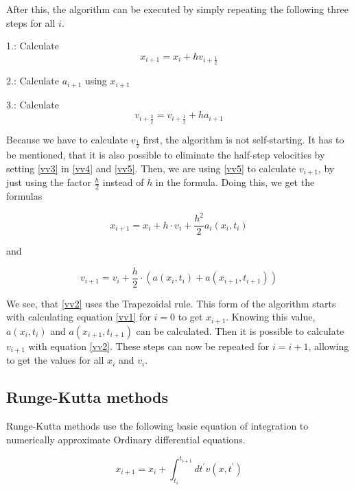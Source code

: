 \documentclass[10pt,a4paper]{article}
\begin{document}
After this, the algorithm can be executed by simply repeating the following three steps for all $i$.

1.: Calculate
\begin{equation}
	\label{vv4}
	x_{i+1} = x_i +h v_{i+ \frac{1}{2}}
\end{equation}

2.: Calculate $a_{i+1}$ using $x_{i+1}$

3.: Calculate
\begin{equation}
	\label{vv5}
v_{i+\frac{3}{2}} = v_{i+\frac{1}{2}} +h a_{i+1}
\end{equation}

Because we have to calculate $v_\frac{1}{2}$ first, the algorithm is not self-starting. It has to be mentioned, that it is also possible to eliminate the half-step velocities by setting \eqref{vv3} in \eqref{vv4} and \eqref{vv5}. Then, we are using \eqref{vv5} to calculate $v_{i+1}$, by just using the factor $\frac{h}{2}$ instead of $h$ in the formula.
Doing this, we get the formulas

\begin{equation}
\label{vv1}
x_{i+1} = x_i + h \cdot v_i + \frac{h^2}{2}  a_i(x_i, t_i)
\end{equation}

and

\begin{equation}
\label{vv2}
v_{i+1} = v_i + \frac{h}{2} \cdot (a(x_i, t_i) + a(x_{i+1}, t_{i+1}))
\end{equation}

We see, that \eqref{vv2} uses the Trapezoidal rule.
This form of the algorithm starts with calculating equation \eqref{vv1} for $i = 0$ to get $x_{i+1}$. Knowing this value, $a(x_i, t_i)$ and $a(x_{i+1}, t_{i+1})$ can be calculated. Then it is possible to calculate $v_{i+1}$ with equation \eqref{vv2}. These steps can now be repeated for $i = i+1$, allowing to get the values for all $x_i$ and $v_i$.

\subsection{Runge-Kutta methods}

Runge-Kutta methods use the following basic equation of integration to numerically approximate Ordinary differential equations.

\begin{equation}
\label{rc1}
x_{i+1} = x_i + \int_{t_i}^{t_{i+1}} dt^{'} v(x, t^{'})
\end{equation}
\end{document}
